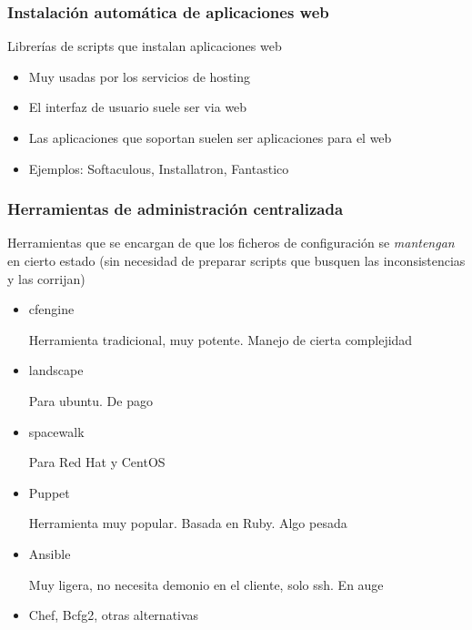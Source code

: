 \documentclass[ucs]{beamer}
\begin{document}
\begin{frame}[fragile]
\frametitle{Instalación automática de aplicaciones web}
Librerías de scripts que instalan aplicaciones web 
\begin{itemize}
\item
Muy usadas por los servicios de hosting

\item
El interfaz de usuario suele ser via web

\item
Las aplicaciones que soportan suelen ser aplicaciones para el web

\item
Ejemplos: Softaculous, Installatron, Fantastico

\end{itemize}

\end{frame}







\begin{frame}[fragile]
\frametitle{Herramientas de administración centralizada}
Herramientas que se encargan de que los ficheros
de configuración se \emph{mantengan} en cierto estado
(sin necesidad de preparar scripts que busquen las inconsistencias
y las corrijan)
\begin{itemize}
\item
cfengine

Herramienta tradicional, muy potente. Manejo de cierta complejidad
\item
landscape

Para ubuntu. De pago
\item
spacewalk

Para Red Hat y CentOS
\item
Puppet

Herramienta muy popular. Basada en Ruby. Algo pesada

\item
Ansible

Muy ligera, no necesita demonio en el cliente, solo ssh. En auge



\item
Chef, Bcfg2, otras alternativas
\end{itemize}

\end{frame}
\end{document}
